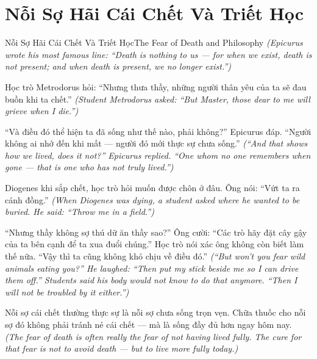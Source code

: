\section{Nỗi Sợ Hãi Cái Chết Và Triết Học}
\begin{truyen}{Nỗi Sợ Hãi Cái Chết Và Triết Học}{The Fear of Death and Philosophy}
\textit{(Epicurus wrote his most famous line: ``Death is nothing to us — for when we exist, death is not present; and when death is present, we no longer exist.'')}

Học trò Metrodorus hỏi: ``Nhưng thưa thầy, những người thân yêu của ta sẽ đau buồn khi ta chết.''
\textit{(Student Metrodorus asked: ``But Master, those dear to me will grieve when I die.'')}

``Và điều đó thể hiện ta đã sống như thế nào, phải không?'' Epicurus đáp. ``Người không ai nhớ đến khi mất — người đó mới thực sự chưa sống.''
\textit{(``And that shows how we lived, does it not?'' Epicurus replied. ``One whom no one remembers when gone — that is one who has not truly lived.'')}

Diogenes khi sắp chết, học trò hỏi muốn được chôn ở đâu. Ông nói: ``Vứt ta ra cánh đồng.''
\textit{(When Diogenes was dying, a student asked where he wanted to be buried. He said: ``Throw me in a field.'')}

``Nhưng thầy không sợ thú dữ ăn thầy sao?'' Ông cười: ``Các trò hãy đặt cây gậy của ta bên cạnh để ta xua đuổi chúng.'' Học trò nói xác ông không còn biết làm thế nữa. ``Vậy thì ta cũng không khó chịu về điều đó.''
\textit{(``But won't you fear wild animals eating you?'' He laughed: ``Then put my stick beside me so I can drive them off.'' Students said his body would not know to do that anymore. ``Then I will not be troubled by it either.'')}

\end{truyen}

\begin{baihoc}
Nỗi sợ cái chết thường thực sự là nỗi sợ chưa sống trọn vẹn. Chữa thuốc cho nỗi sợ đó không phải tránh né cái chết — mà là sống đầy đủ hơn ngay hôm nay.
\textit{(The fear of death is often really the fear of not having lived fully. The cure for that fear is not to avoid death — but to live more fully today.)}
\end{baihoc}
\ngancach

